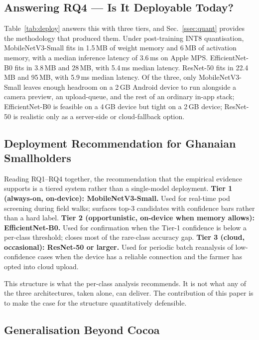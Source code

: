 \documentclass[conference,10pt]{IEEEtran}
\begin{document}
\subsection{Answering RQ4 — Is It Deployable Today?}

Table~\ref{tab:deploy} answers this with three tiers, and
Sec.~\ref{ssec:quant} provides the methodology that produced them. Under
post-training INT8 quantisation, MobileNetV3-Small fits in 1.5\,MB of
weight memory and 6\,MB of activation memory, with a median inference
latency of 3.6\,ms on Apple MPS. EfficientNet-B0 fits in 3.8\,MB and
28\,MB, with 5.4\,ms median latency. ResNet-50 fits in 22.4\,MB and
95\,MB, with 5.9\,ms median latency. Of the three, only MobileNetV3-Small
leaves enough headroom on a 2\,GB Android device to run alongside a
camera preview, an upload-queue, and the rest of an ordinary in-app stack;
EfficientNet-B0 is feasible on a 4\,GB device but tight on a 2\,GB
device; ResNet-50 is realistic only as a server-side or
cloud-fallback option.

\subsection{Deployment Recommendation for Ghanaian Smallholders}

Reading RQ1--RQ4 together, the recommendation that the empirical evidence
supports is a tiered system rather than a single-model deployment.
\textbf{Tier 1 (always-on, on-device): MobileNetV3-Small.} Used for
real-time pod screening during field walks; surfaces top-3 candidates
with confidence bars rather than a hard label.
\textbf{Tier 2 (opportunistic, on-device when memory allows):
EfficientNet-B0.} Used for confirmation when the Tier-1 confidence is
below a per-class threshold; closes most of the rare-class accuracy gap.
\textbf{Tier 3 (cloud, occasional): ResNet-50 or larger.} Used for
periodic batch reanalysis of low-confidence cases when the device has a
reliable connection and the farmer has opted into cloud upload.

This structure is what the per-class analysis recommends. It is not what
any of the three architectures, taken alone, can deliver. The contribution
of this paper is to make the case for the structure quantitatively
defensible.

\subsection{Generalisation Beyond Cocoa}
\end{document}

